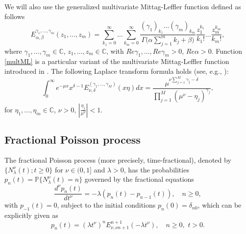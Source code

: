 \documentclass[12pt]{article}
\theoremstyle{definition}
\theoremstyle{plain}
\begin{document}
We will also use the  generalized multivariate Mittag-Leffler function defined as follows
\begin{equation} \label{multML}
	E_{\alpha,\beta}^{\gamma_1, \dots, \gamma_m}(z_1, \dots, z_m) = \sum_{k_1=0}^{\infty} \dots \sum_{k_m=0}^{\infty} \frac{(\gamma_1)_{k_1} \dots (\gamma_m)_{k_m}}{\Gamma\big(\alpha \sum_{j=1}^m k_j + \beta\big)} \frac{z_1^{k_1}}{k_1!} \dots \frac{z_m^{k_m}}{k_m!},
\end{equation}
where $\gamma_1, \dots, \gamma_m \in \mathbb{C}$, $z_1, \dots, z_m \in \mathbb{C}$,  with $Re\gamma_1, \dots, Re\gamma_m >0$, $Re\alpha>0$. Function \eqref{multML} is a particular variant of the multivariate Mittag-Leffler function introduced in \cite{Saxena}. The following Laplace transform formula holds (see, e.g., \cite{CO}):
\begin{equation}\label{multMLfLapl}
		\int_0^\infty e^{-\mu x} x^{\delta-1} E_{\nu,\delta}^{(\gamma_1, \dots, \gamma_M)}(x \eta) dx = \frac{\mu^{\nu \sum_{j=1}^M \gamma_j - \delta}}{\prod_{j=1}^M (\mu^\nu - \eta_j)^{\gamma_j}},
		\end{equation}
for $\eta_1, \dots, \eta_m \in \mathbb{C}$, $\nu>0$, $\left|\frac{\eta_j}{\mu^\nu}\right|<1$.		
	





\subsection{Fractional Poisson process}\label{fractionalPoisson}
The fractional Poisson process (more precisely, time-fractional), denoted by $\{N_{\lambda}^{\nu}(t); t \ge 0\}$ for $\nu \in (0,1]$ and $\lambda >0$, has the  probabilities $p_n(t)=\mathbb{P}\{N_{\lambda}^{\nu}(t)=n\}$ governed by the fractional equations
\begin{equation*}
	\frac{d^\nu p_n(t)}{dt^\nu} = -\lambda(p_n(t) - p_{n-1}(t)), \quad n \ge 0,
\end{equation*}
with $p_{-1}(t) = 0$, subject to the initial conditions
	$p_n(0) = \delta_{n0}$,
which can be explicitly given as
\begin{equation*}
	p_n(t) = (\lambda t^\nu)^n E_{\nu, \nu n+1}^{n+1}(-\lambda t^\nu), \quad n \ge 0,\,\, t > 0.
\end{equation*}
\end{document}
